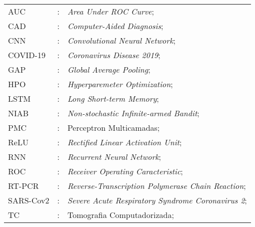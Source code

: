\cleardoublepage
\begin{tabular}{lcl}
AUC & : & \textit{Area Under ROC Curve};\\
CAD & : & \textit{Computer-Aided Diagnosis};\\
CNN & : & \textit{Convolutional Neural Network};\\
COVID-19 & : & \textit{Coronavirus Disease 2019};\\
GAP  & : & \textit{Global Average Pooling};\\
HPO & : & \textit{Hyperparemeter Optimization};\\
LSTM & : & \textit{Long Short-term Memory};\\
NIAB & : & \textit{Non-stochastic Infinite-armed Bandit};\\
PMC & : & Perceptron Multicamadas;\\
ReLU & : & \textit{Rectified Linear Activation Unit};\\
RNN & : & \textit{Recurrent Neural Network};\\
ROC & : & \textit{Receiver Operating Caracteristic};\\
RT-PCR & : & \textit{Reverse-Transcription Polymerase Chain Reaction};\\
SARS-Cov2 & : & \textit{Severe Acute Respiratory Syndrome Coronavirus 2};\\
TC & : & Tomografia Computadorizada;\\

\end{tabular}
\cleardoublepage



\pagestyle{ruledheader}
\tableofcontents
\pagebreak